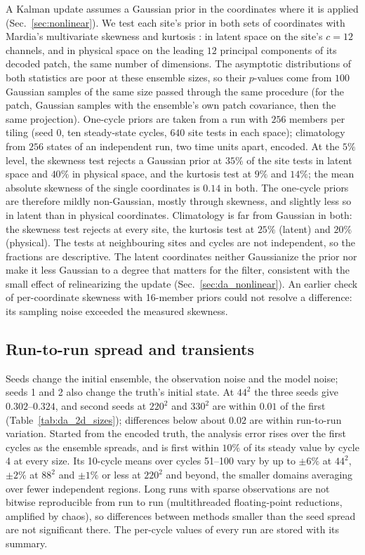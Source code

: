  A Kalman update assumes a Gaussian prior in the
coordinates where it is applied (Sec.~\ref{sec:nonlinear}). We test each
site's prior in both sets of coordinates with Mardia's multivariate
skewness and kurtosis \citep{mardia1970}: in latent space on the site's
$c=12$ channels, and in physical space on the leading $12$ principal
components of its decoded patch, the same number of dimensions. The
asymptotic distributions of both statistics are poor at these ensemble sizes,
so their $p$-values come from $100$ Gaussian samples of the same size passed
through the same procedure (for the patch, Gaussian samples with the
ensemble's own patch covariance, then the same projection). One-cycle
priors are taken from a run with $256$ members per tiling (seed 0, ten
steady-state cycles, $640$ site tests in each space); climatology from
$256$ states of an independent run, two time units apart, encoded.
At the $5\%$ level, the skewness test rejects a Gaussian prior at $35\%$ of
the site tests in latent space and $40\%$ in physical space, and the
kurtosis test at $9\%$ and $14\%$; the mean absolute skewness of the single
coordinates is $0.14$ in both. The one-cycle priors are therefore mildly
non-Gaussian, mostly through skewness, and slightly less so in latent than
in physical coordinates. Climatology is far from Gaussian in both: the
skewness test rejects at every site, the kurtosis test at $25\%$ (latent) and
$20\%$ (physical). The tests at neighbouring sites and cycles are not
independent, so the fractions are descriptive. The latent coordinates
neither Gaussianize the prior nor make it less Gaussian to a degree that
matters for the filter, consistent with the small effect of relinearizing
the update (Sec.~\ref{sec:da_nonlinear}). An earlier check of per-coordinate skewness with
16-member priors could not resolve a difference: its sampling noise exceeded the measured skewness.

\subsection{Run-to-run spread and transients}
\label{app:da_tuning}

Seeds change the initial ensemble, the observation noise and the model noise; seeds 1 and 2 also
change the truth's initial state. At $44^2$ the three seeds give $0.302$--$0.324$, and second seeds at $220^2$
and $330^2$ are within $0.01$ of the first (Table~\ref{tab:da_2d_sizes}); differences below about $0.02$ are
within run-to-run variation. Started from the encoded truth, the analysis error rises over the first
cycles as the ensemble spreads, and is first within $10\%$ of its steady value by cycle 4 at every size.
Its 10-cycle means over cycles 51--100 vary by up to $\pm6\%$ at $44^2$, $\pm2\%$ at $88^2$ and $\pm1\%$ or less at $220^2$ and
beyond, the smaller domains averaging over fewer independent regions. Long runs with sparse
observations are not bitwise reproducible from run to run (multithreaded floating-point reductions,
amplified by chaos), so differences between methods smaller than the seed spread are not
significant there. The per-cycle values of every run are stored with its summary.

